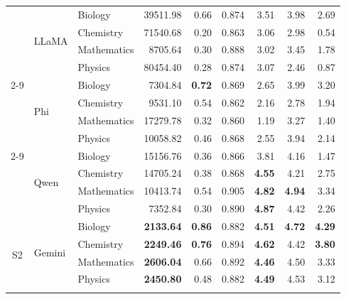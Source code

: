 \documentclass[a4paper,conference]{IEEEtran}
\begin{document}
\begin{table}[!t]
\begin{tabular}{|c|l|l|r|r|r|r|r|r|}
  & \multirow{4}{*}{LLaMA}  & Biology     & 39511.98         & 0.66          & 0.874 & 3.51          & 3.98 & 2.69 \\
  &                         & Chemistry   & 71540.68         & 0.20          & 0.863 & 3.06          & 2.98 & 0.54 \\
  &                         & Mathematics &  8705.64         & 0.30          & 0.888 & 3.02          & 3.45 & 1.78 \\
  &                         & Physics     & 80454.40         & 0.28          & 0.874 & 3.07          & 2.46 & 0.87 \\ \cline{2-9}
  & \multirow{4}{*}{Phi}    & Biology     &  7304.84         & \textbf{0.72} & 0.869 & 2.65          & 3.99 & 3.20 \\
  &                         & Chemistry   &  9531.10         & 0.54          & 0.862 & 2.16          & 2.78 & 1.94 \\
  &                         & Mathematics & 17279.78         & 0.32          & 0.860 & 1.19          & 3.27 & 1.40 \\
  &                         & Physics     & 10058.82         & 0.46          & 0.868 & 2.55          & 3.94 & 2.14 \\ \cline{2-9}
  & \multirow{4}{*}{Qwen}   & Biology     & 15156.76         & 0.36          & 0.866 & 3.81          & 4.16 & 1.47 \\
  &                         & Chemistry   & 14705.24         & 0.38          & 0.868 & \textbf{4.55} & 4.21 & 2.75 \\
  &                         & Mathematics & 10413.74         & 0.54          & 0.905 & \textbf{4.82} & \textbf{4.94} & 3.34 \\
  &                         & Physics     &  7352.84         & 0.30          & 0.890 & \textbf{4.87} & 4.42 & 2.26 \\
\hline
\multirow{20}{*}{S2}
  & \multirow{4}{*}{Gemini} & Biology     & \textbf{2133.64} & \textbf{0.86} & 0.882 & \textbf{4.51} & \textbf{4.72} & \textbf{4.29} \\
  &                         & Chemistry   & \textbf{2249.46} & \textbf{0.76} & 0.894 & \textbf{4.62} & 4.42          & \textbf{3.80} \\
  &                         & Mathematics & \textbf{2606.04} & 0.66          & 0.892 & \textbf{4.46} & 4.50          & 3.33 \\
  &                         & Physics     & \textbf{2450.80} & 0.48          & 0.882 & \textbf{4.49} & 4.53          & 3.12 \\ \cline{2-9}

\end{tabular}
\end{table}
\end{document}
